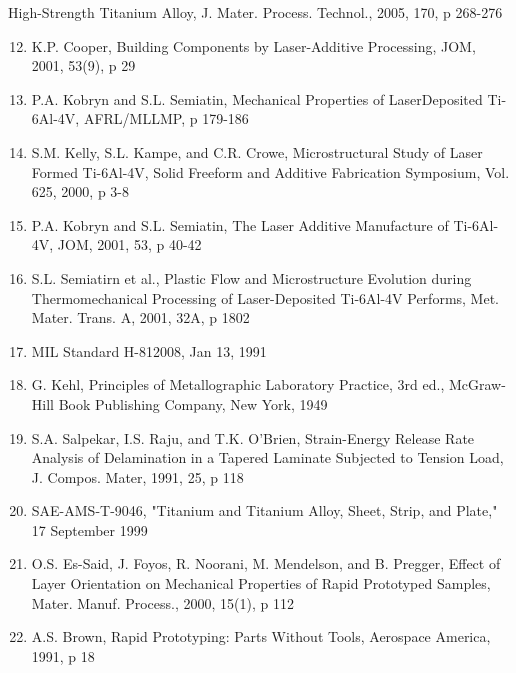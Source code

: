 \documentclass[10pt]{article}
\begin{document}
High-Strength Titanium Alloy, J. Mater. Process. Technol., 2005, 170, p 268-276

\begin{enumerate}
  \setcounter{enumi}{11}
  \item K.P. Cooper, Building Components by Laser-Additive Processing, JOM, 2001, 53(9), p 29

  \item P.A. Kobryn and S.L. Semiatin, Mechanical Properties of LaserDeposited Ti-6Al-4V, AFRL/MLLMP, p 179-186

  \item S.M. Kelly, S.L. Kampe, and C.R. Crowe, Microstructural Study of Laser Formed Ti-6Al-4V, Solid Freeform and Additive Fabrication Symposium, Vol. 625, 2000, p 3-8

  \item P.A. Kobryn and S.L. Semiatin, The Laser Additive Manufacture of Ti-6Al-4V, JOM, 2001, 53, p 40-42

  \item S.L. Semiatirn et al., Plastic Flow and Microstructure Evolution during Thermomechanical Processing of Laser-Deposited Ti-6Al-4V Performs, Met. Mater. Trans. A, 2001, 32A, p 1802

  \item MIL Standard H-812008, Jan 13, 1991

  \item G. Kehl, Principles of Metallographic Laboratory Practice, 3rd ed., McGraw-Hill Book Publishing Company, New York, 1949

  \item S.A. Salpekar, I.S. Raju, and T.K. O'Brien, Strain-Energy Release Rate Analysis of Delamination in a Tapered Laminate Subjected to Tension Load, J. Compos. Mater, 1991, 25, p 118

  \item SAE-AMS-T-9046, "Titanium and Titanium Alloy, Sheet, Strip, and Plate," 17 September 1999

  \item O.S. Es-Said, J. Foyos, R. Noorani, M. Mendelson, and B. Pregger, Effect of Layer Orientation on Mechanical Properties of Rapid Prototyped Samples, Mater. Manuf. Process., 2000, 15(1), p 112

  \item A.S. Brown, Rapid Prototyping: Parts Without Tools, Aerospace America, 1991, p 18

\end{enumerate}
\end{document}
